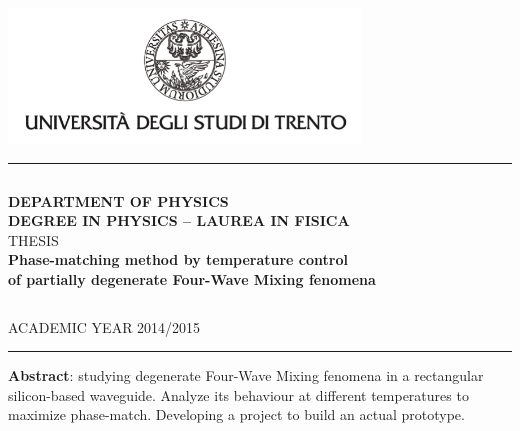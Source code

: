 \documentclass[11pt,a4paper]{article}
\begin{document}
\begin{titlepage}
\begin{center}

\includegraphics[width=0.7\textwidth]{unitn_logo.png}~\\[1.2cm]

\hrule
$$$$
$$$$

\textsc{\LARGE \textbf{DEPARTMENT OF PHYSICS}}\\[0.5cm]
\textsc{\LARGE \textbf{DEGREE IN PHYSICS – LAUREA IN FISICA}}\\[2.5cm]
\textsc{\Large THESIS}\\[1.3cm]

{ \huge \bfseries Phase-matching method by temperature control}\\
[0.5cm]
{ \huge \bfseries of partially degenerate Four-Wave Mixing fenomena}\\
[3.0cm]

\begin{parcolumns}{2}
\end{parcolumns}
$$$$
$$$$
$$$$
$$$$
$$$$
$$$$
$$$$
$$$$

\large ACADEMIC YEAR 2014/2015
\hrule
\vfill
\textbf{Abstract}: studying degenerate Four-Wave Mixing fenomena in a rectangular silicon-based waveguide. Analyze its behaviour at different temperatures to maximize phase-match. Developing a project to build an actual prototype.

\vfill

{\large}

\end{center}
\end{titlepage}
\end{document}
